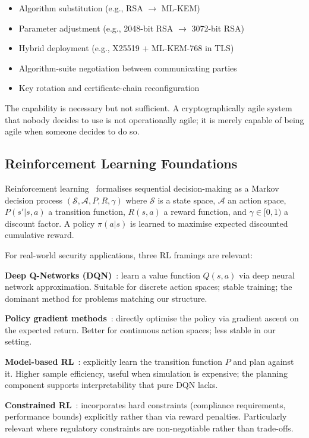 \documentclass[sigconf,nonacm]{acmart}
\begin{document}
\begin{itemize}
  \item Algorithm substitution (e.g., RSA $\to$ ML-KEM)
  \item Parameter adjustment (e.g., 2048-bit RSA $\to$ 3072-bit RSA)
  \item Hybrid deployment (e.g., X25519 + ML-KEM-768 in TLS)
  \item Algorithm-suite negotiation between communicating parties
  \item Key rotation and certificate-chain reconfiguration
\end{itemize}

The capability is necessary but not sufficient. A cryptographically
agile system that nobody decides to use is not operationally agile;
it is merely capable of being agile when someone decides to do so.

\subsection{Reinforcement Learning Foundations}

Reinforcement learning~\cite{sutton2018reinforcement} formalises
sequential decision-making as a Markov decision process
$(\mathcal{S}, \mathcal{A}, P, R, \gamma)$ where $\mathcal{S}$ is a
state space, $\mathcal{A}$ an action space, $P(s'|s,a)$ a transition
function, $R(s,a)$ a reward function, and $\gamma \in [0,1)$ a
discount factor. A policy $\pi(a|s)$ is learned to maximise
expected discounted cumulative reward.

For real-world security applications, three RL framings are relevant:

\textbf{Deep Q-Networks (DQN)}~\cite{mnih2015dqn}: learn a value
function $Q(s,a)$ via deep neural network approximation. Suitable for
discrete action spaces; stable training; the dominant method for
problems matching our structure.

\textbf{Policy gradient methods}~\cite{schulman2017ppo}: directly
optimise the policy via gradient ascent on the expected return.
Better for continuous action spaces; less stable in our setting.

\textbf{Model-based RL}~\cite{moerland2023modelsurv}: explicitly learn
the transition function $P$ and plan against it. Higher sample
efficiency, useful when simulation is expensive; the planning
component supports interpretability that pure DQN lacks.

\textbf{Constrained RL}~\cite{garcia2024constrained}: incorporates
hard constraints (compliance requirements, performance bounds)
explicitly rather than via reward penalties. Particularly relevant
where regulatory constraints are non-negotiable rather than
trade-offs.
\end{document}
